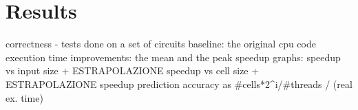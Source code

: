 \chapter{Results}\label{sec:results}
correctness - tests done on a set of circuits
baseline: the original cpu code execution time
improvements: the mean and the peak speedup
graphs: speedup vs input size + ESTRAPOLAZIONE
        speedup vs cell size + ESTRAPOLAZIONE
speedup prediction accuracy as #cells*2^i/#threads / (real ex. time)
